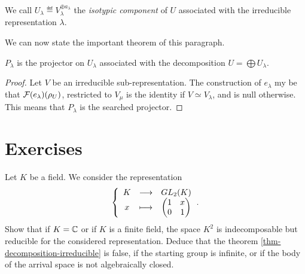 \begin{defn}
 We call $ U_{\lambda} \eqdef V_{\lambda}^{\oplus a_{\lambda}} $ the \textit{isotypic component} of $ U $ associated with the irreducible representation $ \lambda $.
\end{defn}
We can now state the important theorem of this paragraph.
 
\begin{prop}
  $ P_{\lambda} $ is the projector on $ U_{\lambda} $ associated with the decomposition $ U = \bigoplus U_\lambda $.
\end{prop}
\begin{proof}
Let $V$ be an irreducible sub-representation. The construction of $ e_\lambda $ my \-be that $ \mathcal{F}(e_\lambda) (\rho_U) $, restricted to $ V_\mu $ is the identity if $ V \simeq V_\lambda $, and is null otherwise. This means that $ P_\lambda $ is the searched projector.
\end{proof}
 
\section{Exercises}
\label{sect1-chap5-exercises}
 
 
 
\begin{exo}
\label{exo-reductibility-decomposability}
 
Let $K$ be a field. We consider the representation
\begin{equation*}
{\left\{ \begin{array}{ccc} K & \longrightarrow & GL_2 (K) \\ x & \longmapsto & \begin{pmatrix} 1 & x \\0 & 1 \end{pmatrix} \end{array} \right.}.
\end{equation*}
Show that if $ K = \mathbb{C} $ or if $K$ is a finite field, the space $ K^2 $ is indecomposable but reducible for the considered representation. Deduce that the theorem \ref{thm-decomposition-irreducible} is false, if the starting group is infinite, or if the body of the arrival space is not algebraically closed.
\end{exo}
 
